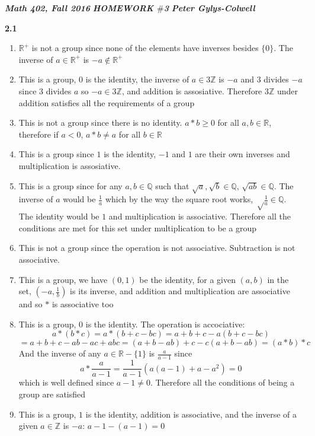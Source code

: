 \documentclass[12pt]{article}
\newenvironment{ques}{\vspace{2 ex}}{\vspace{2 ex}}
\theoremstyle{definition}
\begin{document}
\noindent \textit{\textbf{Math 402, Fall 2016}} \hspace{1.3cm} \textit{\textbf{HOMEWORK $\#$3}} \hspace{1.3cm} \textit{\textbf{Peter Gylys-Colwell}} 

\vspace{1cm}

\begin{ques}
\textbf{2.1} 
	\begin{enumerate}
		\item $\mathbb{R}^+$ is not a group since none of the elements
			have inverses besides $\{0\}$. The inverse of $a \in
			\mathbb{R}^+$ is $-a \notin \mathbb{R}^+$\\
		\item This is a group, $0$ is the identity, the inverse of $a
			\in 3\mathbb{Z}$ is $-a$ and $3$ divides $-a$ since 3
			divides $a$ so $-a \in 3\mathbb{Z}$, and addition is
			assosiative. Therefore $3\mathbb{Z}$ under addition
			satisfies all the requirements of a group
		\item This is not a group since there is no identity. $a * b
			\geq 0$ for all $a,b \in \mathbb{R}$, therefore if $a <
			0$, $a * b \neq a$ for all $b \in \mathbb{R}$
		\item This is a group since $1$ is the identity, $-1$ and $1$
			are their own inverses and multiplication is
			assosiative.
		\item This is a group since for any $a, b \in \mathbb{Q}$ such
			that $\sqrt{a}, \sqrt{b} \in \mathbb{Q}$, $\sqrt{ab}
			\in \mathbb{Q}$. The inverse of $a$ would be $\frac1a$
			which by the way the square root works, $\sqrt \frac1a
			\in \mathbb{Q}$. The identity would be $1$ and
			multiplication is associative. Therefore all the
			conditions are met for this set under multiplication to
			be a group
		\item This is not a group since the operation is not
			associative. Subtraction is not associative.
		\item This is a group, we have $(0,1)$ be the identity, for a
			given $(a,b)$ in the set, $(-a, \frac1b)$ is its
			inverse, and addition and multiplication are
			associative and so $*$ is associative too
		\item This is a group, $0$ is the identity. The operation is
			accociative: 
			$$a * (b * c) = a * (b + c - bc) = a + b + c - a(b + c - bc) $$
			$$= a + b + c - ab - ac + abc = (a + b - ab) + c -
			c(a+b - ab) = (a * b) * c$$ 
			And the inverse of any $a \in \mathbb{R} - \{1\}$ is
			$\frac{a}{a-1}$ since 
			$$a * \frac{a}{a-1} = \frac1{a-1}(a(a-1) + a - a^2) =
			0$$ which is well defined since $a-1 \neq 0$. Therefore
			all the conditions of being a group are satisfied
		\item This is a group, $1$ is the identity, addition is
			associative, and the inverse of a given $a \in
			\mathbb{Z}$ is $-a$: $a - 1 - (a - 1) = 0$
	\end{enumerate}

\end{ques}
\end{document}
